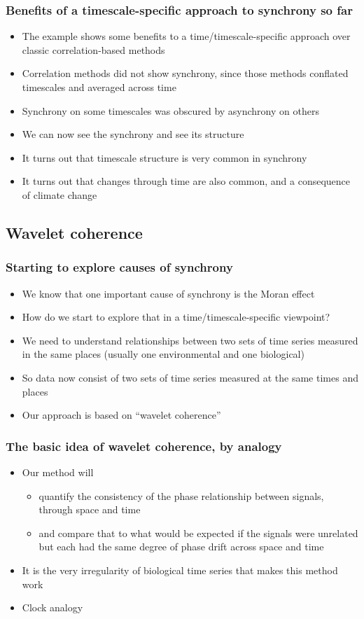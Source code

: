 \documentclass{beamer}
\begin{document}
{
\begin{frame}
\frametitle{Benefits of a timescale-specific approach to synchrony so far}
\begin{itemize}
\item The example shows some benefits to a time/timescale-specific approach over classic correlation-based methods
\item Correlation methods did not show synchrony, since those methods conflated timescales and averaged across time
\item Synchrony on some timescales was obscured by asynchrony on others
\item We can now see the synchrony and see its structure
\item It turns out that timescale structure is very common in synchrony
\item It turns out that changes through time are also common, and a consequence of climate change
\end{itemize}
\end{frame}}

\subsection{Wavelet coherence}

{
\begin{frame}
\frametitle{Starting to explore causes of synchrony}
\begin{itemize}
\item We know that one important cause of synchrony is the Moran effect
\item How do we start to explore that in a time/timescale-specific viewpoint?
\item We need to understand relationships between two sets of time series measured in the same places
(usually one environmental and one biological)
\item So data now consist of two sets of time series measured at the same times and places
\item Our approach is based on ``wavelet coherence''
\end{itemize}
\end{frame}}

\begin{frame}
\frametitle{The basic idea of wavelet coherence, by analogy}
\begin{itemize}
\item Our method will 
\begin{itemize}
\item quantify the consistency of the phase relationship between signals, through space and time
\item and compare that to what would be expected if the signals were unrelated but each had the same degree of phase drift across space and time
\end{itemize}
\item It is the very irregularity of biological time series that makes this method work
\item Clock analogy
\end{itemize}
\end{frame}
\end{document}
